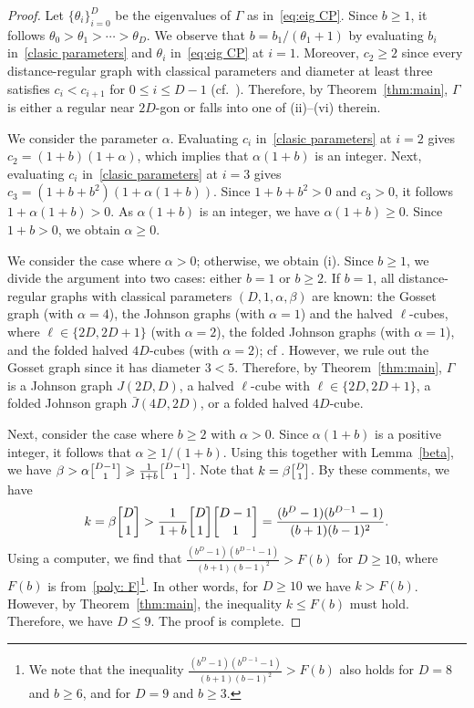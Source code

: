 \begin{proof}
Let $\{\theta_i\}^D_{i=0}$ be the eigenvalues of $\Gamma$ as in~\eqref{eq:eig CP}. 
Since $b\geqslant 1$, it follows $\theta_0 > \theta_1> \cdots > \theta_D$.
We observe that $b = {b_1}/(\theta_1 + 1)$ by evaluating $b_i$ in~\eqref{clasic parameters} and $\theta_i$ in~\eqref{eq:eig CP} at $i=1$.
Moreover, $c_2 \geqslant 2$ since every distance-regular graph with classical parameters and diameter at least three satisfies $c_i < c_{i+1}$ for $0\leqslant i \leqslant D-1$ (cf.~\cite[Theorem~6.1.2]{BCN}).
Therefore, by Theorem~\ref{thm:main}, $\Gamma$ is either a regular near $2D$-gon or falls into one of (ii)--(vi) therein.

We consider the parameter $\alpha$. 
Evaluating $c_i$ in~\eqref{clasic parameters} at $i=2$ gives $c_2=(1+b)(1+\alpha)$, which implies that $\alpha(1+b)$ is an integer. 
Next, evaluating $c_i$ in~\eqref{clasic parameters} at $i=3$ gives $c_3 = (1+b+b^2)(1+\alpha(1+b))$. Since $1+b+b^2 > 0$ and $c_3 > 0$, it follows $1+\alpha(1+b) > 0$.
As $\alpha(1+b)$ is an integer, we have $\alpha(1+b) \geqslant 0$.
Since $1+b > 0$, we obtain $\alpha \geqslant 0$.

We consider the case where $\alpha>0$; otherwise, we obtain (i).
Since $b\geqslant 1$, we divide the argument into two cases: either $b=1$ or $b\geqslant2$. 
If $b=1$, all distance-regular graphs with classical parameters $(D,1,\alpha,\beta)$ are known: the Gosset graph (with $\alpha =4$), the Johnson graphs (with $\alpha =1$) and the halved $\ell$-cubes, where $\ell \in \{2D,2D+1\}$ (with $\alpha =2$), the folded Johnson graphs (with $\alpha=1$), and the folded halved $4D$-cubes (with $\alpha=2)$; cf {\cite[Sections 6.1, 6.3]{BCN}}. 
However, we rule out the Gosset graph since it has diameter $3 < 5$. 
Therefore, by Theorem~\ref{thm:main}, $\Gamma$ is a Johnson graph $J(2D,D)$, a halved $\ell$-cube with $\ell \in \{2D,2D+1\}$, a folded Johnson graph $\bar{J}(4D,2D)$, or
a folded halved $4D$-cube.

Next, consider the case where $b\geqslant2$ with $\alpha>0$. 
Since $\alpha(1 + b)$ is a positive integer, it follows that $\alpha \geqslant 1/(1 + b)$.
Using this together with Lemma~\ref{beta}, we have $\beta > \alpha \genfrac{\lbrack}{\rbrack}{0pt}{}{D-1}{1} \geqslant \frac{1}{1+b}\genfrac{\lbrack}{\rbrack}{0pt}{}{D-1}{1}$.
Note that $k=\beta \genfrac{\lbrack}{\rbrack}{0pt}{}{D}{1}$.
By these comments, we have
\begin{align*}
	k = \beta \genfrac{\lbrack}{\rbrack}{0pt}{}{D}{1}
	> \frac{1}{1+b}\genfrac{\lbrack}{\rbrack}{0pt}{}{D}{1}\genfrac{\lbrack}{\rbrack}{0pt}{}{D-1}{1}
	= \frac{(b^D-1)(b^{D-1}-1)}{(b+1)(b-1)^2}.
\end{align*}
Using a computer, we find that $\frac{(b^D-1)(b^{D-1}-1)}{(b+1)(b-1)^2} >F(b)$ for $D\geqslant 10$, where $F(b)$ is from~\eqref{poly: F}\footnote{
We note that the inequality $\frac{(b^D-1)(b^{D-1}-1)}{(b+1)(b-1)^2} >F(b)$ also holds for $D=8$ and $b\geqslant 6$, and for $D=9$ and $b\geqslant 3$.}.
In other words, for $D\geqslant 10$ we have $k > F(b)$.
However, by Theorem~\ref{thm:main}, the inequality $k \leqslant F(b)$ must hold. 
Therefore, we have $D \leqslant 9$. 
The proof is complete.
\end{proof}

